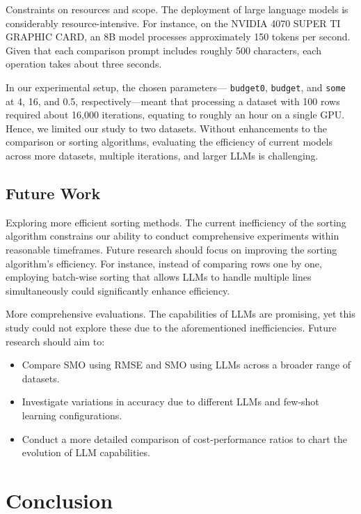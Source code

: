 \documentclass{ieeeaccess}
\begin{document}
Constraints on resources and scope. The deployment of large language models is considerably resource-intensive. For instance, on the NVIDIA 4070 SUPER TI GRAPHIC CARD, an 8B model processes approximately 150 tokens per second. Given that each comparison prompt includes roughly 500 characters, each operation takes about three seconds.

In our experimental setup, the chosen parameters— \texttt{budget0}, \texttt{budget}, and \texttt{some} at 4, 16, and 0.5, respectively—meant that processing a dataset with 100 rows required about 16,000 iterations, equating to roughly an hour on a single GPU. Hence, we limited our study to two datasets. Without enhancements to the comparison or sorting algorithms, evaluating the efficiency of current models across more datasets, multiple iterations, and larger LLMs is challenging.

\subsection{Future Work}

Exploring more efficient sorting methods. The current inefficiency of the sorting algorithm constrains our ability to conduct comprehensive experiments within reasonable timeframes. Future research should focus on improving the sorting algorithm's efficiency. For instance, instead of comparing rows one by one, employing batch-wise sorting that allows LLMs to handle multiple lines simultaneously could significantly enhance efficiency.

More comprehensive evaluations. The capabilities of LLMs are promising, yet this study could not explore these due to the aforementioned inefficiencies. Future research should aim to:
\begin{itemize}
\item Compare SMO using RMSE and SMO using LLMs across a broader range of datasets.
\item Investigate variations in accuracy due to different LLMs and few-shot learning configurations.
\item Conduct a more detailed comparison of cost-performance ratios to chart the evolution of LLM capabilities.
\end{itemize}

\section{Conclusion}
\label{sec:conclusion}
\end{document}
